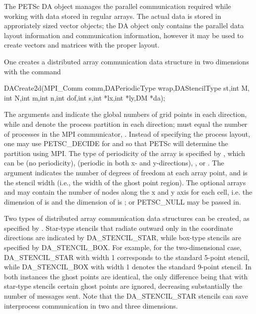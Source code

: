 The PETSc DA object manages the parallel communication required
while working with data stored in regular arrays. The actual data
is stored in approriately sized vector objects; the DA object 
only contains the parallel data layout information and communication
information, however it may be used to create vectors and matrices with the
proper layout.

One creates a distributed array communication data structure 
in two dimensions with the command 
\begin{tabbing}
  DACreate2d(MPI\_Comm comm,DAPeriodicType wrap,DAStencilType st,int M,\\
             int N,int m,int n,int dof,int s,int *lx,int *ly,DM *da);
\end{tabbing}
The   arguments
  and  indicate the global
numbers of grid points in each direction, while  and 
denote the process partition in each direction;  must equal
the number of processes in the MPI communicator, .  
Instead of specifying the process layout, one may use
PETSC_DECIDE for  and  
so that PETSc will determine the partition using MPI. The type of
periodicity of the array is specified by , which can be 
  (no periodicity), 
  (periodic in
both x- and y-directions),  , 
or .  The argument  
indicates the number of degrees of freedom at each array point,
and  is the stencil width (i.e., the width of the ghost point region).
The optional arrays  and  may contain the number of nodes
along the x and y axis for each cell, i.e. the dimension of  is
 and the dimension of  is ; or PETSC_NULL 
may be passed in.

Two types of distributed array communication data structures 
can be created, as specified by .
Star-type stencils that radiate outward only in the coordinate
directions are indicated by DA_STENCIL_STAR,
while box-type stencils are specified by
DA_STENCIL_BOX. For example, for the
two-dimensional case,
DA_STENCIL_STAR with width 1 corresponds to the standard 5-point
stencil, while DA_STENCIL_BOX with width 1 denotes the
standard 9-point stencil.  In both instances the ghost points are
identical, the only difference being that with star-type stencils
certain ghost points are ignored, decreasing substantially
the number of messages sent.  Note that the DA_STENCIL_STAR
stencils can save interprocess communication in two and three
dimensions.

